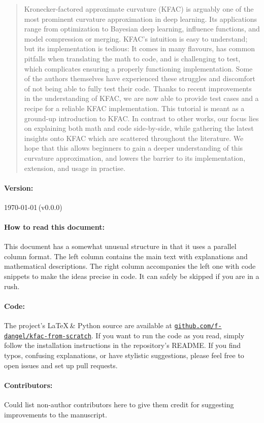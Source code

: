 \begin{abstract}
  Kronecker-factored approximate curvature (KFAC) is arguably one of the most prominent curvature approximation in deep learning.
  Its applications range from optimization to Bayesian deep learning, influence functions, and model compression or merging.
  KFAC's intuition is easy to understand; but its implementation is tedious: It comes in many flavours, has common pitfalls when translating the math to code, and is challenging to test, which complicates ensuring a properly functioning implementation.
  Some of the authors themselves have experienced these struggles and discomfort of not being able to fully test their code.
  Thanks to recent improvements in the understanding of KFAC, we are now able to provide test cases and a recipe for a reliable KFAC implementation.
  This tutorial is meant as a ground-up introduction to KFAC.
  In contrast to other works, our focus lies on explaining both math and code side-by-side, while gathering the latest insights onto KFAC which are scattered throughout the literature.
  We hope that this allows beginners to gain a deeper understanding of this curvature approximation, and lowers the barrier to its implementation, extension, and usage in practise.
\end{abstract}

\vfill

\paragraph{Version:} \today\,(v0.0.0)

\paragraph{How to read this document:}
This document has a somewhat unusual structure in that it uses a parallel column format.
The left column contains the main text with explanations and mathematical descriptions.
The right column accompanies the left one with code snippets to make the ideas precise in code.
It can safely be skipped if you are in a rush.

\paragraph{Code:} The project's \LaTeX\,\& Python source are available at \href{\repourl}{\texttt{github.com/f-dangel/kfac-from-scratch}}. If you want to run the code as you read, simply follow the installation instructions in the repository's README. If you find typos, confusing explanations, or have stylistic suggestions, please feel free to open issues and set up pull requests.

\paragraph{Contributors:} Could list non-author contributors here to give them credit for suggesting improvements to the manuscript.
\vspace{\baselineskip}

